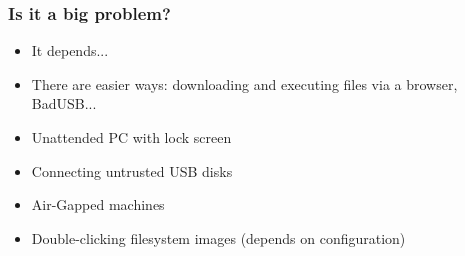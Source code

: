 

\begin{frame}

    \frametitle{Is it a big problem?}
    
        \begin{itemize}
            \item<2-> It depends...
            \item<3-> There are easier ways: downloading and executing files via a browser, BadUSB...
        \end{itemize}
    

        \begin{itemize}
            \item<4-> Unattended PC with lock screen
            \item<4-> Connecting untrusted USB disks
            \item<4-> Air-Gapped machines
            \item<4-> Double-clicking filesystem images (depends on configuration)
        \end{itemize}
\end{frame}